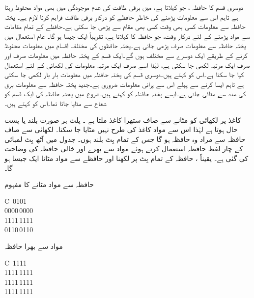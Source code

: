 دوسری قسم کا حافظہ ، جو  کہلاتا ہے، میں برقی طاقت کی عدم موجودگی میں بھی مواد محفوظ رہتا ہے تاہم اس سے معلومات پڑھنے کی خاطر حافظے کو درکار برقی طاقت فراہم کرنا لازم ہے۔ پختہ حافظہ سے معلومات کسی بھی وقت کسی بھی مقام سے پڑھی جا سکتی ہے۔حافظے کے تمام مقامات سے مواد پڑھنے کے لئے درکار وقت، جو حافظہ کا کہلاتا ہے، تقریباً ایک جیسا ہو گا۔ عام استعمال میں پختہ حافظہ سے معلومات صرف پڑھی جاتی ہے۔پختہ حافظوں کی مختلف اقسام میں معلومات محفوظ کرنے کے طریقے ایک دوسرے سے مختلف ہوں گے۔ایک قسم کے پختہ حافظہ میں معلومات صرف اور صرف ایک مرتبہ لکھی جا سکتی ہے، لہٰذا اسے صرف ایک مرتبہ معلومات کی لکھائی کے لئے استعمال کیا جا سکتا ہے۔اس کو  کہتے ہیں۔دوسری قسم کی پختہ حافظہ میں معلومات بار بار لکھی جا سکتی ہے تاہم ایسا کرنے سے پہلے اس سے پرانی معلومات ضروری ہے۔جدید پختہ حافظہ سے معلومات برق کی مدد سے مٹائی جاتی ہے۔ایسے پختہ حافظہ کو  کہتے ہیں۔شروع میں پختہ حافظہ کی ایک قسم کو شعاع سے مٹایا جاتا تھا۔اس کو  کہتے ہیں۔

کاغذ پر لکھائی کو مٹانے سے صاف ستھرا کاغذ ملتا ہے ۔ پلٹ ہر صورت بلند یا پست حال ہوتا ہے لہٰذا اس سے مواد کاغذ کی طرح نہیں مٹایا جا سکتا۔ لکھائی سے صاف حافظہ سے مراد وہ حافظہ ہو گا جس کے تمام بِٹ بلند  ہوں۔ جدول  میں آٹھ بِٹ لمبائی کے چار لفظ حافظہ استعمال کرتے ہوئے مواد سے بھرے اور خالی حافظہ کی وضاحت کی گئی ہے۔ یقیناً ، حافظہ کے تمام بِٹ پر  لکھنا اور حافظے سے مواد مٹانا ایک جیسا ہو گا۔
\begin{table}
\caption{حافظہ سے مواد مٹانے کا مفہوم}
\label{جدول_حافظہ_خالی}
\centering
\begin{subtable}[t]{0.48\textwidth}
\centering
\begin{tabular}{C}
\,0101\\
0000\,0000\\
1111\,1111\\
0110\,0110\\
\bottomrule
\end{tabular}
\caption{مواد سے بھرا حافظہ}
\end{subtable}%
\begin{subtable}[t]{0.48\textwidth}
\centering
\begin{tabular}{C}
\,1111\\
1111\,1111\\
1111\,1111\\
1111\,1111\\
\bottomrule
\end{tabular}
\caption{مواد سے خالی حافظہ}
\end{subtable}
\end{table}


